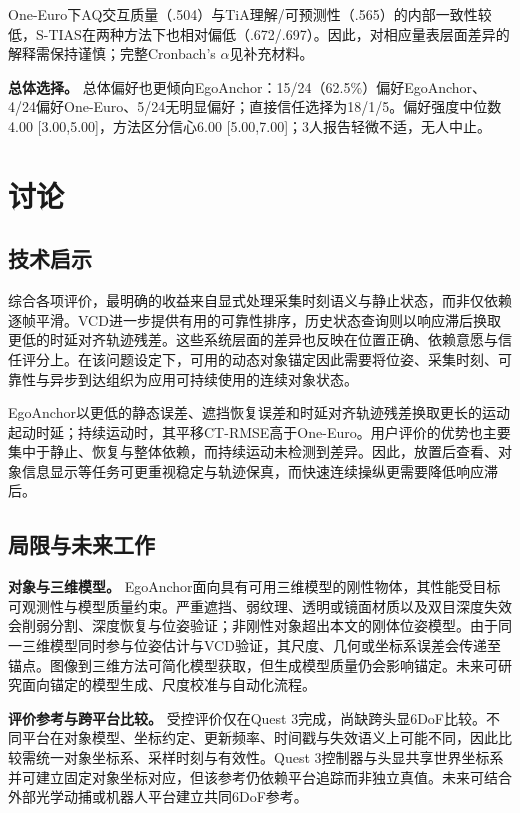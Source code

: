 \documentclass[review]{vgtc}
\begin{document}
One-Euro下AQ交互质量（.504）与TiA理解/可预测性（.565）的内部一致性较低，S-TIAS在两种方法下也相对偏低（.672/.697）。因此，对相应量表层面差异的解释需保持谨慎；完整Cronbach's $\alpha$见补充材料。

\textbf{总体选择。}
总体偏好也更倾向EgoAnchor：15/24（62.5\%）偏好EgoAnchor、4/24偏好One-Euro、5/24无明显偏好；直接信任选择为18/1/5。偏好强度中位数4.00 [3.00,5.00]，方法区分信心6.00 [5.00,7.00]；3人报告轻微不适，无人中止。

\section{讨论}\label{sec:discussion}

\subsection{技术启示}

综合各项评价，最明确的收益来自显式处理采集时刻语义与静止状态，而非仅依赖逐帧平滑。VCD进一步提供有用的可靠性排序，历史状态查询则以响应滞后换取更低的时延对齐轨迹残差。这些系统层面的差异也反映在位置正确、依赖意愿与信任评分上。在该问题设定下，可用的动态对象锚定因此需要将位姿、采集时刻、可靠性与异步到达组织为应用可持续使用的连续对象状态。

EgoAnchor以更低的静态误差、遮挡恢复误差和时延对齐轨迹残差换取更长的运动起动时延；持续运动时，其平移CT-RMSE高于One-Euro。用户评价的优势也主要集中于静止、恢复与整体依赖，而持续运动未检测到差异。因此，放置后查看、对象信息显示等任务可更重视稳定与轨迹保真，而快速连续操纵更需要降低响应滞后。

\subsection{局限与未来工作}

\textbf{对象与三维模型。}
EgoAnchor面向具有可用三维模型的刚性物体，其性能受目标可观测性与模型质量约束。严重遮挡、弱纹理、透明或镜面材质以及双目深度失效会削弱分割、深度恢复与位姿验证；非刚性对象超出本文的刚体位姿模型。由于同一三维模型同时参与位姿估计与VCD验证，其尺度、几何或坐标系误差会传递至锚点。图像到三维方法可简化模型获取，但生成模型质量仍会影响锚定。未来可研究面向锚定的模型生成、尺度校准与自动化流程。

\textbf{评价参考与跨平台比较。}
受控评价仅在Quest 3完成，尚缺跨头显6DoF比较。不同平台在对象模型、坐标约定、更新频率、时间戳与失效语义上可能不同，因此比较需统一对象坐标系、采样时刻与有效性。Quest 3控制器与头显共享世界坐标系并可建立固定对象坐标对应，但该参考仍依赖平台追踪而非独立真值。未来可结合外部光学动捕或机器人平台建立共同6DoF参考。
\end{document}
